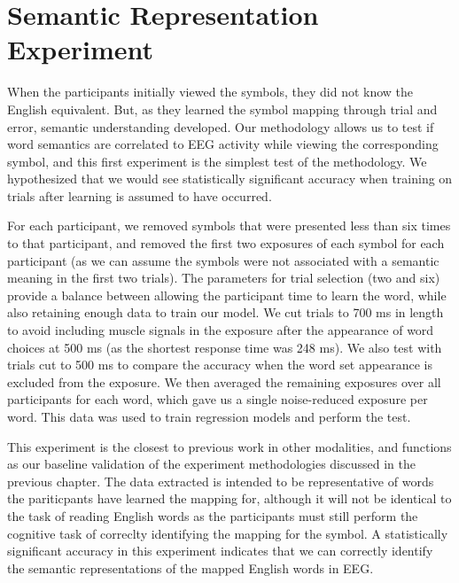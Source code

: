 \section{Semantic Representation Experiment}
\label{sec:experiments:semanticrepresentation}
When the participants initially viewed the symbols, they did not know the 
English equivalent. But, as they learned the symbol mapping through trial and 
error, semantic understanding developed. Our methodology allows us to test if 
word semantics are correlated to EEG activity while viewing the corresponding 
symbol, and this first experiment is the simplest test of the methodology. We 
hypothesized that we would see statistically significant accuracy when training 
on trials after learning is assumed to have occurred.

For each participant, we removed symbols that were presented less than six 
times to that participant, and removed the first two exposures of each symbol 
for each participant (as we can assume the symbols were not associated with a 
semantic meaning in the first two trials). The parameters for trial selection 
(two and six) provide a balance between allowing the participant time to learn 
the word, while also retaining enough data to train our model. We cut trials to 
700 ms in length to avoid including muscle signals in the exposure after the 
appearance of word choices at 500 ms (as the shortest response time was 248 
ms).  We also test with trials cut to 500 ms to compare the \tvt accuracy when 
the word set appearance is excluded from the exposure. We then averaged the 
remaining exposures over all participants for each word, which gave us a single 
noise-reduced exposure per word. This data was used to train regression models 
and perform the \tvt test. 

This experiment is the closest to previous work in other modalities, and 
functions as our baseline validation of the experiment methodologies discussed 
in the previous chapter. The data extracted is intended to be representative of 
words the pariticpants have learned the mapping for, although it will not be 
identical to the task of reading English words as the participants must still 
perform the cognitive task of correclty identifying the mapping for the symbol.  
A statistically significant \tvt accuracy in this experiment indicates that we 
can correctly identify the semantic representations of the mapped English words 
in EEG.
